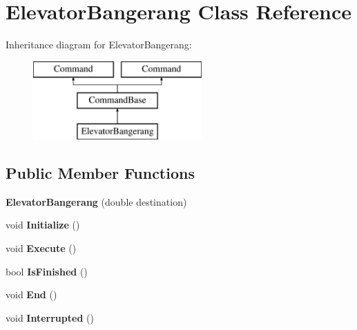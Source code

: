 \hypertarget{class_elevator_bangerang}{}\section{Elevator\+Bangerang Class Reference}
\label{class_elevator_bangerang}
Inheritance diagram for Elevator\+Bangerang\+:\begin{figure}[H]
\begin{center}
\leavevmode
\includegraphics[height=3.000000cm]{class_elevator_bangerang}
\end{center}
\end{figure}
\subsection*{Public Member Functions}
\begin{DoxyCompactItemize}
\item 
\hypertarget{class_elevator_bangerang_aa6267cd3cdbe4b18ddc5bf1d1fe8b932}{}{\bfseries Elevator\+Bangerang} (double destination)\label{class_elevator_bangerang_aa6267cd3cdbe4b18ddc5bf1d1fe8b932}

\item 
\hypertarget{class_elevator_bangerang_ad9ddf2a05f8b870f37b0cbf92f320914}{}void {\bfseries Initialize} ()\label{class_elevator_bangerang_ad9ddf2a05f8b870f37b0cbf92f320914}

\item 
\hypertarget{class_elevator_bangerang_a78d3422f3cde7c4c4b39d11fdecc0bea}{}void {\bfseries Execute} ()\label{class_elevator_bangerang_a78d3422f3cde7c4c4b39d11fdecc0bea}

\item 
\hypertarget{class_elevator_bangerang_af07c4c38f767ad6c5350487509743259}{}bool {\bfseries Is\+Finished} ()\label{class_elevator_bangerang_af07c4c38f767ad6c5350487509743259}

\item 
\hypertarget{class_elevator_bangerang_a8522414be02fe710c76fa4adc6664042}{}void {\bfseries End} ()\label{class_elevator_bangerang_a8522414be02fe710c76fa4adc6664042}

\item 
\hypertarget{class_elevator_bangerang_a55e48660e5b474f25503cdd9358a30d3}{}void {\bfseries Interrupted} ()\label{class_elevator_bangerang_a55e48660e5b474f25503cdd9358a30d3}

\end{DoxyCompactItemize}
